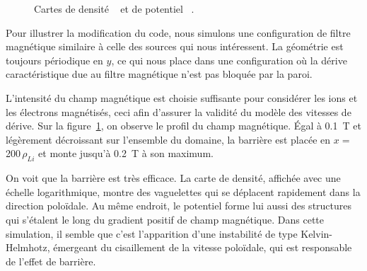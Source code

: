 \begin{refsection}
\begin{figure}[!htbp]
    \centering
    \caption{Cartes de densité ~ et de
    potentiel
    ~.}
    \label{2-CartesMagBarrier}
\end{figure}

Pour illustrer la modification du code, nous simulons une configuration de
filtre magnétique similaire à celle des sources qui nous intéressent. 
La géométrie est toujours périodique en $y$, ce qui nous place dans une
configuration où la dérive caractéristique due au filtre magnétique n'est pas
bloquée par la paroi.

L'intensité du champ
magnétique est choisie suffisante pour considérer les ions et les électrons
magnétisés, ceci afin d'assurer la validité du modèle des vitesses de dérive.
Sur la figure~\ref{2-CartesMagBarrier}, on observe le profil du champ
magnétique. Égal à 0.1~T et légèrement décroissant sur l'ensemble du domaine,
la barrière est placée en $x=\,$200$\,\rho_{Li}$ et monte jusqu'à 0.2~T à son maximum.

On voit que la barrière est très efficace. La carte de densité, affichée avec
une échelle logarithmique, montre des vaguelettes qui se déplacent rapidement
dans la direction poloïdale.
Au même endroit, le potentiel forme lui aussi des structures qui s'étalent le
long du gradient positif de champ magnétique. 
Dans cette simulation, il semble que c'est l'apparition d'une instabilité de
type Kelvin-Helmhotz, émergeant du cisaillement de la vitesse 
poloïdale, qui est responsable de l'effet de barrière.


\end{refsection}
